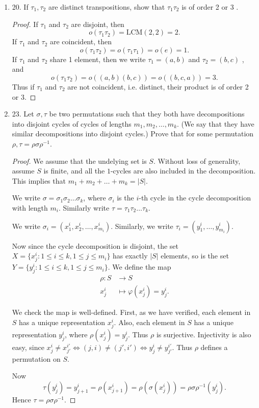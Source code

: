 \begin{enumerate}[resume]
\begin{proof}
	With all transpositions in hand, it will be easy to contruct all the permutations.
	We have verified in class that for any $\sigma = (a_1,a_2,\ldots,a_k)$, \[
		\sigma = (a_1,a_k)\ldots(a_1,a_3)(a_1,a_2)
	.\] 
\end{proof}

\item 20. If $\tau_1, \tau_2$ are distinct transpositions, show that $\tau_1 \tau_2$ is of order 2 or 3 .
\begin{proof}
	If $\tau_1$ and $\tau_2$ are disjoint, then \[
		o(\tau_1\tau_2) = \text{LCM}(2, 2) = 2
	.\] 
	If $\tau_1$ and $\tau_2$ are coincident, then  \[
		o(\tau_1\tau_2) = o(\tau_1\tau_1) = o(e) = 1
	.\] 
	If $\tau_1$ and $\tau_2$ share 1 element, then we write $\tau_1 = (a,b)$ and $\tau_2 = (b,c)$ , and 
	\[
		o(\tau_1\tau_2) = o((a,b)(b,c)) = o((b,c,a)) = 3
	.\] 
	Thus if $\tau_1$ and $\tau_2$ are not coincident, i.e. distinct, their product is of order 2 or 3.
\end{proof}

\item 23. Let $\sigma, \tau$ be two permutations such that they both have decompositions into disjoint cycles of cycles of lengths $m_1, m_2, \ldots, m_k$. (We say that they have similar decompositions into disjoint cycles.) Prove that for some permutation $\rho, \tau=\rho \sigma \rho^{-1}$.
\begin{proof}
	We assume that the undelying set is $S$. Without loss of generality, assume $S $ is finite,  and all the $1$-cycles are also included in the decomposition. This implies that $m_1+m_2+\ldots+m_k = |S|$.

	We write $\sigma = \sigma_1\sigma_2\ldots\sigma_k$, where $\sigma_i$ is the $i$-th cycle in the cycle decomposition with length $m_i$. Similarly write $\tau = \tau_1\tau_2\ldots\tau_k$.

	We write $\sigma_i = \left( x_1^{i} , x_2^i, \ldots, x_{m_i}^i \right) $. Similarly, we write $\tau_i = \left( y_1^i, \ldots, y_{m_i}^i \right) $.

	Now since the cycle decomposition is disjoint, the set $X = \{x_j^i: 1\le i\le k, 1\le j\le m_i\} $ has exactly $|S|$ elements, so is the set $Y = \{y_j^i: 1\le i\le k, 1\le j\le m_i\} $. We define the map
	\begin{align*}
		\rho: S &\longrightarrow S \\
		x_j^i &\longmapsto \varphi(x_j^i) = y_j^i
	.\end{align*}

	We check the map is well-defined. First, as we have verified, each element in $S$ has a unique representation $x_j^i$. Also, each element in $S$ has a unique representation $y_j^i$, where $\rho(x_j^i) = y_j^i$. Thus $\rho$ is surjective. Injectivity is also easy, since $x_j^i \neq x_{j'}^{i'} \iff (j,i)\neq (j',i') \iff y_j^i \neq y_{j'}^{i'}$. Thus $\rho$ defines a permutation on $S$. 

	Now
	\[
		\tau(y_j^i) = y_{j+1}^i = \rho(x_{j+1}^i) = \rho(\sigma(x_j^i)) = \rho\sigma\rho^{-1} (y_j^i)
	.\] 
	Hence $\tau = \rho\sigma\rho^{-1} $.
\end{proof}

\end{enumerate}
